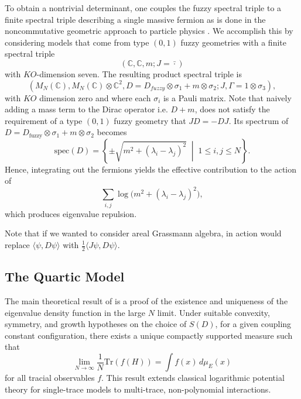 \documentclass[11pt]{article}
\theoremstyle{plain}
\begin{document}
To obtain a nontrivial determinant, one couples the fuzzy spectral triple to a 
finite spectral triple describing a single massive fermion as is done in the noncommutative geometric approach to particle physics \cite{VS}. We accomplish this by considering models that come from type $(0,1)$ fuzzy geometries with a finite spectral triple
\begin{equation*}
	(\mathbb{C},\mathbb{C},m;J=\bar{\cdot})
\end{equation*}
with $KO$-dimension seven. The resulting product spectral triple is
\begin{equation}
	\left(M_N(\mathbb{C}), M_N(\mathbb{C}) \otimes \mathbb{C}^2, D=D_{f u z z y} \otimes \sigma_1+m \otimes \sigma_2 ; J, \Gamma=1 \otimes \sigma_3\right),
\end{equation}
with $KO$ dimension zero and where each $\sigma_{i}$ is a Pauli matrix. Note that naively adding a mass term to the Dirac operator i.e. $D+m$, does not satisfy the requirement of a type $(0,1)$ fuzzy geometry that $JD = -DJ$. Its spectrum of $D = D_{\mathrm{fuzzy}} \otimes \sigma_{1} 
+ m \otimes \sigma_{2}$ becomes
\begin{equation}
	\label{eq:massive-spectrum-plain}
	\mathrm{spec}(D)
	=
	\left\{
	\pm\sqrt{m^{2} + (\lambda_i - \lambda_j)^{2}} 
	\;\middle|\; 1\le i,j\le N
	\right\}.
\end{equation}
Hence, integrating out the fermions yields the effective contribution to the action of
\begin{equation}
	\label{eq:fermionic-log-plain}
	\sum_{i,j} 
	\log\!\bigl(m^{2}+(\lambda_{i}-\lambda_{j})^{2}\bigr),
\end{equation}
which produces eigenvalue repulsion.

Note that if we wanted to consider areal Grassmann algebra, in action would replace $\langle \psi, D\psi\rangle$ with $\frac{1}{2}\langle J \psi, D \psi\rangle$.

\subsection{The Quartic Model}
The main theoretical result of \cite{Khalkhali2025 large N limit} is a proof of the existence and
uniqueness of the eigenvalue density function in the large $N$ limit. Under suitable convexity, symmetry, and growth hypotheses on the choice of $S(D)$, for a given coupling constant configuration,
there exists a unique compactly supported measure such that
\[
\lim_{N\to\infty}
\frac{1}{N}\mathrm{Tr}(f(H))
=
\int f(x)\, d\mu_{E}(x)
\]
for all tracial observables $f$.
This result extends classical logarithmic potential theory for single-trace
models to multi-trace, non-polynomial interactions. 
\end{document}
